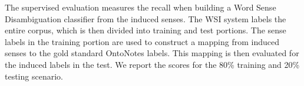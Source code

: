 \documentclass[11pt]{article}
\begin{document}
The supervised evaluation measures the recall when building a Word Sense
Disambiguation classifier from the induced senses.  The WSI system labels the
entire corpus, which is then divided into training and test portions.  The sense
labels in the training portion are used to construct a mapping from induced
senses to the gold standard OntoNotes labels.  This mapping is then evaluated
for the induced labels in the test.  We report the scores for the 80\% training
and 20\% testing scenario.

\begin{figure}[t!f]
  \vspace{-5mm}
  \center

   \\
   \\


\end{figure}
\end{document}

